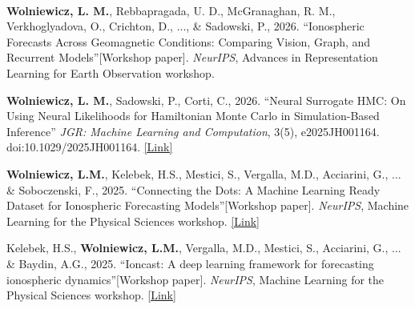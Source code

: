 
\vspace{-0.5mm}

\begin{cventries}

	\cventry
	{} %
	{\ } %
	{\ } %
	{} %
{   	\vspace{-9mm}
	\begin{cvitemize2}
        \item \label{ionospheric_forecasts}
            \textbf{Wolniewicz, L. M.}, Rebbapragada, U. D., McGranaghan, R. M., Verkhoglyadova, O., Crichton, D., ..., \& Sadowski, P., 2026. ``Ionospheric Forecasts Across Geomagnetic Conditions: Comparing Vision, Graph, and Recurrent Models''[Workshop paper]. \textit{NeurIPS}, Advances in Representation Learning for Earth Observation workshop.
        \vspace{0.5mm}
        \item \label{neural_surrogate}
            \textbf{Wolniewicz, L. M.}, Sadowski, P., Corti, C., 2026. ``Neural Surrogate HMC: On Using Neural Likelihoods for Hamiltonian Monte Carlo in Simulation-Based Inference'' \textit{JGR: Machine Learning and Computation}, 3(5), e2025JH001164. doi:10.1029/2025JH001164. \href{https://agupubs.onlinelibrary.wiley.com/doi/10.1029/2025JH001164}{\textcolor{link}{[Link]}}
        \vspace{0.5mm}
        \item \label{ionosphere_dataset}
            \textbf{Wolniewicz, L.M.}, Kelebek, H.S., Mestici, S., Vergalla, M.D., Acciarini, G., ... \& Soboczenski, F., 2025. ``Connecting the Dots: A Machine Learning Ready Dataset for Ionospheric Forecasting Models''[Workshop paper]. \textit{NeurIPS}, Machine Learning for the Physical Sciences workshop. \href{https://ml4physicalsciences.github.io/2025/files/NeurIPS_ML4PS_2025_358.pdf}{\textcolor{link}{[Link]}}
        \vspace{0.5mm}
        \item \label{ioncast}
            Kelebek, H.S., \textbf{Wolniewicz, L.M.}, Vergalla, M.D., Mestici, S., Acciarini, G., ... \& Baydin, A.G., 2025. ``Ioncast: A deep learning framework for forecasting ionospheric dynamics''[Workshop paper]. \textit{NeurIPS}, Machine Learning for the Physical Sciences workshop. \href{https://ml4physicalsciences.github.io/2025/files/NeurIPS_ML4PS_2025_360.pdf}{\textcolor{link}{[Link]}}
        \vspace{0.5mm}
        \item \label{kepler}

\end{cvitemize2}}
\end{cventries}
